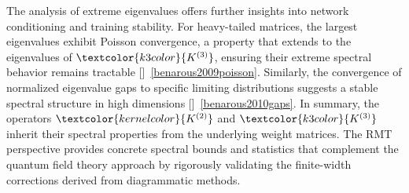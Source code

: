 The analysis of extreme eigenvalues offers further insights into network conditioning and training stability. For heavy-tailed matrices, the largest eigenvalues exhibit Poisson convergence, a property that extends to the eigenvalues of $\textcolor{k3color}{K^{(3)}}$, ensuring their extreme spectral behavior remains tractable []~\ref{benarous2009poisson}. Similarly, the convergence of normalized eigenvalue gaps to specific limiting distributions suggests a stable spectral structure in high dimensions []~\ref{benarous2010gaps}. In summary, the operators $\textcolor{kernelcolor}{K^{(2)}}$ and $\textcolor{k3color}{K^{(3)}}$ inherit their spectral properties from the underlying weight matrices. The RMT perspective provides concrete spectral bounds and statistics that complement the quantum field theory approach by rigorously validating the finite-width corrections derived from diagrammatic methods.

